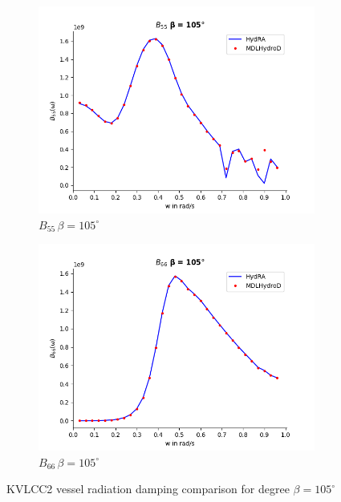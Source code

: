 \begin{figure}[H]
\begin{subfigure}[b]{0.45\textwidth}
        \includegraphics[width=\textwidth]{plots/kvlcc/radiation_damp/b55.png}
        \caption{$B_{55} \, \beta = 105^{\circ}$}
    \end{subfigure}
    \begin{subfigure}[b]{0.45\textwidth}
        \includegraphics[width=\textwidth]{plots/kvlcc/radiation_damp/b66.png}
        \caption{$B_{66} \, \beta = 105^{\circ}$}
    \end{subfigure}
    \caption{KVLCC2 vessel radiation damping comparison for degree $\beta= 105^{\circ}$}
    \label{fig:kvlcc_radition_damp_105}
\end{figure}

